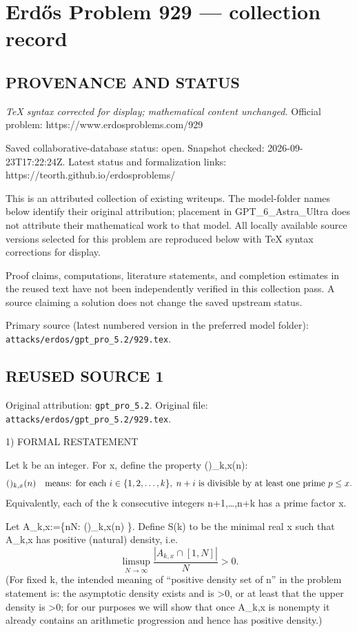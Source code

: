 \section*{Erd\H{o}s Problem 929 --- collection record}

\subsection*{PROVENANCE AND STATUS}

\emph{TeX syntax corrected for display; mathematical content unchanged.}
Official problem: https://www.erdosproblems.com/929

Saved collaborative-database status: open.
Snapshot checked: 2026-09-23T17:22:24Z.
Latest status and formalization links: https://teorth.github.io/erdosproblems/

This is an attributed collection of existing writeups. The model-folder names below identify their original attribution; placement in GPT\_6\_Astra\_Ultra does not attribute their mathematical work to that model. All locally available source versions selected for this problem are reproduced below with TeX syntax corrections for display.

Proof claims, computations, literature statements, and completion estimates in the reused text have not been independently verified in this collection pass. A source claiming a solution does not change the saved upstream status.

Primary source (latest numbered version in the preferred model folder): \texttt{attacks/erdos/gpt\_pro\_5.2/929.tex}.

\subsection*{REUSED SOURCE 1}
Original attribution: \texttt{gpt\_pro\_5.2}.
Original file: \texttt{attacks/erdos/gpt\_pro\_5.2/929.tex}.


1) FORMAL RESTATEMENT

Let k be an integer.
For x, define the property (\*)_{k,x}(n):
\[(\*)_{k,x}(n)\quad\text{means: for each } i\in\{1,2,\dots,k\},\; n+i \text{ is divisible by at least one prime } p\le x.\]
Equivalently, each of the k consecutive integers n+1,\dots,n+k has a prime factor \le x.

Let A_{k,x}:=\{n\in\mathbb N: (\*)_{k,x}(n) \}.
Define S(k) to be the minimal real x such that A_{k,x} has positive (natural) density, i.e.
\[ \limsup_{N\to\infty} \frac{|A_{k,x}\cap[1,N]|}{N} > 0. \]
(For fixed k, the intended meaning of “positive density set of n” in the problem statement is: the asymptotic density exists and is >0, or at least that the upper density is >0; for our purposes we will show that once A_{k,x} is nonempty it already contains an arithmetic progression and hence has positive density.)

